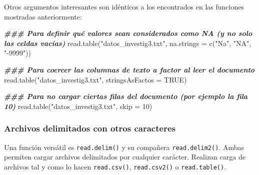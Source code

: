 \documentclass[
]{article}
\newenvironment{Shaded}{\begin{snugshade}}{\end{snugshade}}
\newcommand{\AttributeTok}[1]{\textcolor[rgb]{0.77,0.63,0.00}{#1}}
\newcommand{\ConstantTok}[1]{\textcolor[rgb]{0.00,0.00,0.00}{#1}}
\newcommand{\DecValTok}[1]{\textcolor[rgb]{0.00,0.00,0.81}{#1}}
\newcommand{\DocumentationTok}[1]{\textcolor[rgb]{0.56,0.35,0.01}{\textbf{\textit{#1}}}}
\newcommand{\FunctionTok}[1]{\textcolor[rgb]{0.00,0.00,0.00}{#1}}
\newcommand{\NormalTok}[1]{#1}
\newcommand{\StringTok}[1]{\textcolor[rgb]{0.31,0.60,0.02}{#1}}
\theoremstyle{definition}
\theoremstyle{definition}
\theoremstyle{definition}
\theoremstyle{definition}
\theoremstyle{remark}
\begin{document}
Otros argumentos interesantes son idénticos a los encontrados en las funciones mostradas anteriormente:

\begin{Shaded}
\begin{Highlighting}[]
\DocumentationTok{\#\#\# Para definir qué valores sean considerados como NA (y no solo las celdas vacías)}
\FunctionTok{read.table}\NormalTok{(}\StringTok{"datos\_investig3.txt"}\NormalTok{, }\AttributeTok{na.strings =} \FunctionTok{c}\NormalTok{(}\StringTok{"Na"}\NormalTok{, }\StringTok{"NA"}\NormalTok{, }\StringTok{"{-}9999"}\NormalTok{))}

\DocumentationTok{\#\#\# Para coercer las columnas de texto a factor al leer el documento}
\FunctionTok{read.table}\NormalTok{(}\StringTok{"datos\_investig3.txt"}\NormalTok{, }\AttributeTok{stringsAsFactos =} \ConstantTok{TRUE}\NormalTok{)}

\DocumentationTok{\#\#\# Para no cargar ciertas filas del documento (por ejemplo la fila 10)}
\FunctionTok{read.table}\NormalTok{(}\StringTok{"datos\_investig3.txt"}\NormalTok{, }\AttributeTok{skip =} \DecValTok{10}\NormalTok{)}
\end{Highlighting}
\end{Shaded}

\hypertarget{archivos-delimitados-con-otros-caracteres}{%
\subsubsection{Archivos delimitados con otros caracteres}\label{archivos-delimitados-con-otros-caracteres}}

Una función versátil es \texttt{read.delim()} y su compañera \texttt{read.delim2()}. Ambas permiten cargar archivos delimitados por cualquier carácter. Realizan carga de archivos tal y como lo hacen \texttt{read.csv()}, \texttt{read.csv2()} o \texttt{read.table()}.
\end{document}

